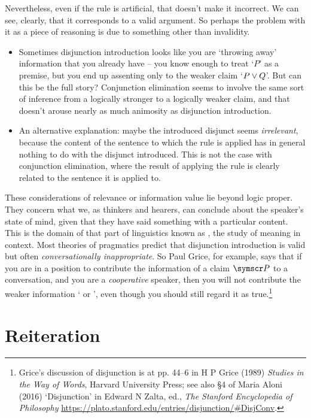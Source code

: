 Nevertheless, even if the rule is artificial, that doesn't make it incorrect. We can see, clearly, that it corresponds to a valid argument. So perhaps the problem with it as a piece of reasoning is due to something other than invalidity. \begin{itemize}
    	\item Sometimes disjunction introduction looks like you are `throwing away' information that you already have – you know enough to treat `$P$' as a premise, but you end up assenting only to the weaker claim `$P \vee Q$'. But can this be the full story? Conjunction elimination seems to involve the same sort of inference from a logically stronger to a logically weaker claim, and that doesn't arouse nearly as much animosity as disjunction introduction. 
	\item An alternative explanation: maybe the introduced disjunct seems \emph{irrelevant}, because the content of the sentence to which the rule is applied has in general nothing to do with the disjunct introduced. This is not the case with conjunction elimination, where the result of applying the rule is clearly related to the sentence it is applied to.
    		\end{itemize} 
These considerations of relevance or information value lie beyond logic proper. They concern what we, as thinkers and hearers, can conclude about the speaker's state of mind, given that they have said something with a particular content. This is the domain of that part of linguistics known as , the study of meaning in context. Most theories of pragmatics predict that disjunction introduction is valid but often \emph{conversationally inappropriate}. So Paul Grice, for example, says that if you are in a position to contribute the information of a claim $\meta{P}$ to a conversation, and you are a \emph{cooperative} speaker, then you will not contribute the weaker information ` or ', even though you should still regard it as true.\footnote{Grice's discussion of disjunction is at pp. 44–6 in H P Grice (1989) \emph{Studies in the Way of Words}, Harvard University Press; see also §4 of Maria Aloni (2016) `Disjunction' in Edward N Zalta, ed., \emph{The Stanford Encyclopedia of Philosophy} \url{https://plato.stanford.edu/entries/disjunction/\#DisjConv}.}

\section{Reiteration}\label{reit}


